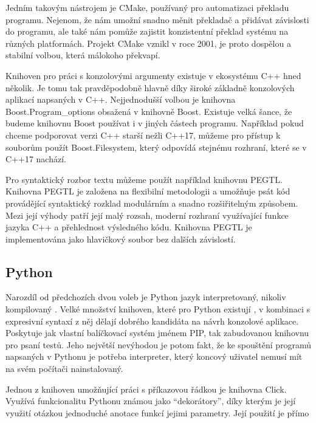 Jedním takovým nástrojem je CMake\cite{cmake}, používaný pro automatizaci překladu programu. Nejenom, že nám umožní snadno měnit překladač a přidávat závislosti do programu, ale také nám pomůže zajistit konzistentní překlad systému na různých platformách\todocite. Projekt CMake vznikl v roce 2001\cite{cmake-overview}, je proto dospělou a stabilní volbou, která málokoho překvapí.

Knihoven pro práci s konzolovými argumenty existuje v ekosystému C++ hned několik. Je tomu tak pravděpodobně hlavně díky široké základně konzolových aplikací napsaných v C++. Nejjednodušší volbou je knihovna Boost.Program\_options obsažená v knihovně Boost\cite{boost-filesystem}. Existuje velká šance, že budeme knihovnu Boost používat i v jiných částech programu. Například  pokud chceme podporovat verzi C++ starší nežli C++17\cite{cpp-filesystem}, můžeme pro přístup k souborům použít Boost.Filesystem, který odpovídá stejnému rozhraní, které se v C++17 nachází\cite{boost-filesystem}.

Pro syntaktický rozbor textu můžeme použít například knihovnu PEGTL\cite{github-pegtl}. Knihovna PEGTL je založena na flexibilní metodologii a umožňuje psát kód provádějící syntaktický rozklad modulárním a snadno rozšiřitelným způsobem. Mezi její výhody patří její malý rozsah, moderní rozhraní využívající funkce jazyka C++ a přehlednost výsledného kódu. Knihovna PEGTL je implementována jako hlavičkový soubor bez dalších závislostí\cite{github-pegtl}.


\subsection{Python}

Narozdíl od předchozích dvou voleb je Python jazyk interpretovaný, nikoliv kompilovaný . Velké množství knihoven, které pro Python existují , v kombinaci s expresivní syntaxí z něj dělají dobrého kandidáta na návrh konzolové aplikace. Poskytuje jak vlastní balíčkovací systém jménem PIP\todocite, tak zabudovanou knihovnu pro psaní testů\todocite. Jeho největší nevýhodou je potom fakt, že ke spouštění programů napsaných v Pythonu je potřeba interpreter\todocite, který koncový uživatel nemusí mít na svém počítači nainstalovaný.

Jednou z knihoven umožňující práci s příkazovou řádkou je knihovna Click\cite{website-click}. Využívá funkcionalitu Pythonu známou jako ``dekorátory'', díky kterým je její využití otázkou jednoduché anotace funkcí jejimi parametry. Její použití je přímo

